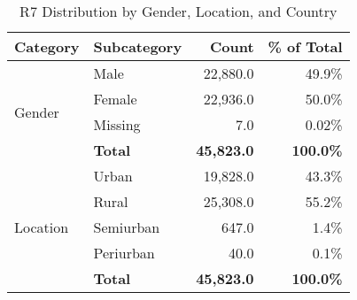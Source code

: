 \documentclass{article}
\begin{document}
\newpage
\clearpage
\begin{table}[ht]
\centering
\caption{R7 Distribution by Gender, Location, and Country}
\begin{tabular}{llrr}
\toprule
\textbf{Category} & \textbf{Subcategory} & \textbf{Count} & \textbf{\% of Total} \\
\midrule

\multirow{4}{*}{Gender} 
    & Male & 22,880.0 & 49.9\% \\
    & Female & 22,936.0 & 50.0\% \\
    & Missing & 7.0 & 0.02\% \\
    & \textbf{Total} & \textbf{45,823.0} & \textbf{100.0\%} \\
\midrule

\multirow{5}{*}{Location} 
    & Urban & 19,828.0 & 43.3\% \\
    & Rural & 25,308.0 & 55.2\% \\
    & Semiurban & 647.0 & 1.4\% \\
    & Periurban & 40.0 & 0.1\% \\
    & \textbf{Total} & \textbf{45,823.0} & \textbf{100.0\%} \\
\midrule


\end{tabular}
\end{table}
\end{document}
